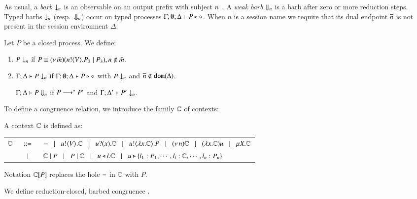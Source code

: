 \documentclass[runningheads]{llncs}
\begin{document}

As usual, a \emph{barb} $\downarrow_{n}$ is an observable on an output prefix with subject $n$~\cite{MiSa92}.
A \emph{weak barb} $\Downarrow_{n}$ is a barb after zero or more reduction steps.
Typed barbs $\downarrow_{n}$ (resp.\ $\Downarrow_{n}$)
occur on typed processes $\Gamma; \emptyset; \Delta \vdash P \triangleright \diamond$.
When $n$ is a session name we require that its dual endpoint $\overline{n}$ is not present
in the session environment $\Delta$:

\begin{definition}[Barbs]%
	Let $P$ be a closed process. We define:
	\begin{enumerate}[1.]
		\item	
		$P \downarrow_{n}$ if $P \equiv (\nu\, \tilde{m})(n ! \langle V \rangle . P_2 \;|\; P_3), n \notin \tilde{m}$. %

		\item	$\Gamma; \Delta \vdash P \downarrow_{n}$ if
			$\Gamma; \emptyset; \Delta \vdash P \triangleright \diamond$ with $P \downarrow_{n}$ and $\overline{n} \notin \mathtt{dom}(\Delta)$.

			$\Gamma; \Delta \vdash P \Downarrow_{n}$ if $P \longrightarrow^* P'$ and
			$\Gamma; \Delta' \vdash P' \downarrow_{n}$.			
	\end{enumerate}
\end{definition}



To define a congruence relation, we introduce the family ${\mathbb{C}}$ of contexts:

\begin{definition}[Context]
	A context ${\mathbb{C}}$ is defined as:

	\begin{tabular}{rcl}
		${\mathbb{C}}$ & $\;\;::=\;\;$ & $- \;\;\;|\;\;\; u ! \langle V \rangle . {\mathbb{C}} \;\;\;|\;\;\; u ? (x) . {\mathbb{C}} \;\;\;|\;\;\; u ! \langle \lambda x.{\mathbb{C}} \rangle . P \;\;\;|\;\;\; (\nu\, n) {\mathbb{C}}
		\;\;\;|\;\;\; (\lambda x.{\mathbb{C}})u \;\;\;|\;\;\; \mu X. {\mathbb{C}}$ 
		\\
		&$\;\;\;|\;\;\;$& ${\mathbb{C}} \;|\; P \;\;\;|\;\;\; P \;|\; {\mathbb{C}}
		\;\;\;|\;\;\; u \triangleleft l . {\mathbb{C}} \;\;\;|\;\;\; u \triangleright \{l_1:P_1,\cdots,l_i:{\mathbb{C}},\cdots,l_n:P_n\}$
	\end{tabular}

Notation ${\mathbb{C}}[P]$ replaces 
the hole $-$ in ${\mathbb{C}}$ with $P$.
\end{definition}


We define reduction-closed, barbed congruence \cite{HondaKYoshida95}. 
\end{document}
